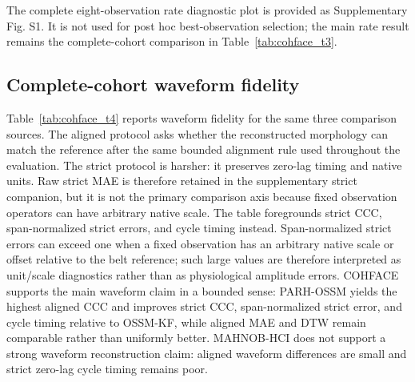 \documentclass[fleqn,10pt]{wlscirep}
\begin{document}
The complete eight-observation rate diagnostic plot is provided as Supplementary
Fig. S1. It is not used for post hoc best-observation selection; the
main rate result remains the complete-cohort comparison in
Table~\ref{tab:cohface_t3}.

\subsection*{Complete-cohort waveform fidelity}
Table~\ref{tab:cohface_t4} reports waveform fidelity for the same three
comparison sources. The aligned protocol asks whether the reconstructed
morphology can match the reference after the same bounded alignment rule used
throughout the evaluation. The strict protocol is harsher: it preserves zero-lag
timing and native units. Raw strict MAE is therefore retained in
the supplementary strict companion, but it is not the primary comparison
axis because fixed observation operators can have arbitrary native scale. The
table foregrounds strict CCC, span-normalized strict errors, and cycle timing
instead. Span-normalized strict errors can exceed one when a fixed observation
has an arbitrary native scale or offset relative to the belt reference; such
large values are therefore interpreted as unit/scale diagnostics rather than as
physiological amplitude errors. COHFACE supports the main waveform claim in a
bounded sense: PARH-OSSM yields the highest aligned CCC and improves strict
CCC, span-normalized strict error, and cycle timing relative to OSSM-KF, while
aligned MAE and DTW remain comparable rather than uniformly better. MAHNOB-HCI does not
support a strong waveform reconstruction claim: aligned waveform differences
are small and strict zero-lag cycle timing remains poor.
\end{document}
